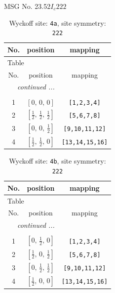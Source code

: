 \documentclass[fleqn,8pt]{jsarticle}
\begin{document}
\setcounter{MaxMatrixCols}{32}

\renewcommand{\tablename}{Table~}
\renewcommand{\figurename}{Figure~}
\begin{center}
\LARGE
MSG No. 23.52\quad$I_{c}222$
\end{center}
\renewcommand{\arraystretch}{1.2}
\begin{longtable}{ccc}
\caption{Wyckoff site: {\tt 4a}, site symmetry: {\tt 222}}
 \\
 \hline \hline
No. & position & mapping \\ \hline \endfirsthead

\multicolumn{2}{l}{\tablename\ \thetable{}} \\
 \hline \hline
No. & position & mapping \\ \hline \endhead

 \hline \hline
\multicolumn{2}{r}{\footnotesize\it continued ...} \\ \endfoot

 \hline \hline
\multicolumn{2}{r}{} \\ \endlastfoot

1 & $\left[ 0,\, 0,\, 0 \right]$ & {\tt [1,2,3,4]} \\ \hline
2 & $\left[ \frac{1}{2},\, \frac{1}{2},\, \frac{1}{2} \right]$ & {\tt [5,6,7,8]} \\ \hline
3 & $\left[ 0,\, 0,\, \frac{1}{2} \right]$ & {\tt [9,10,11,12]} \\ \hline
4 & $\left[ \frac{1}{2},\, \frac{1}{2},\, 0 \right]$ & {\tt [13,14,15,16]} \\
\end{longtable}
\renewcommand{\arraystretch}{1.2}
\begin{longtable}{ccc}
\caption{Wyckoff site: {\tt 4b}, site symmetry: {\tt 222}}
 \\
 \hline \hline
No. & position & mapping \\ \hline \endfirsthead

\multicolumn{2}{l}{\tablename\ \thetable{}} \\
 \hline \hline
No. & position & mapping \\ \hline \endhead

 \hline \hline
\multicolumn{2}{r}{\footnotesize\it continued ...} \\ \endfoot

 \hline \hline
\multicolumn{2}{r}{} \\ \endlastfoot

1 & $\left[ 0,\, \frac{1}{2},\, 0 \right]$ & {\tt [1,2,3,4]} \\ \hline
2 & $\left[ \frac{1}{2},\, 0,\, \frac{1}{2} \right]$ & {\tt [5,6,7,8]} \\ \hline
3 & $\left[ 0,\, \frac{1}{2},\, \frac{1}{2} \right]$ & {\tt [9,10,11,12]} \\ \hline
4 & $\left[ \frac{1}{2},\, 0,\, 0 \right]$ & {\tt [13,14,15,16]} \\
\end{longtable}
\end{document}
